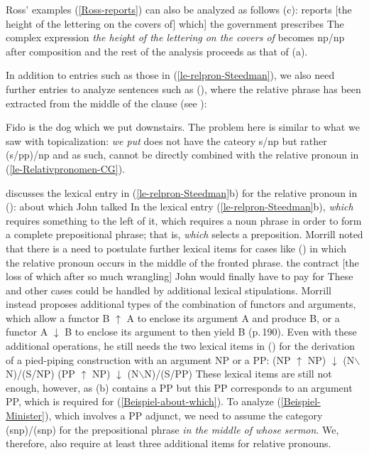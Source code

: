 Ross' examples (\ref{Ross-reports}) can also be analyzed as follows (c):
\ea
reports [the height of the lettering on the covers of]
which] the government prescribes
\z
The complex expression \emph{the height of the lettering on the covers of} becomes np/np after composition and the rest of the analysis
proceeds as that of (a).

In addition to entries such as those in (\ref{le-relpron-Steedman}), we also need further entries to
analyze sentences such as (), where the relative phrase has been extracted from the middle of
the clause (see \citealp[]{Pollard88a}):

\ea
Fido is the dog which we put downstairs.
\z
The problem here is similar to what we saw with topicalization: \emph{we put} does not have the cateory
s/np but rather (s/pp)/np and as such, cannot be directly combined with the relative pronoun in (\ref{le-Relativpronomen-CG}).

\citet[]{Morrill95a} discusses the lexical entry in (\ref{le-relpron-Steedman}b) for the relative pronoun in ():
\ea
\label{Beispiel-about-which}
about which John talked
\z
In the lexical entry (\ref{le-relpron-Steedman}b), \emph{which} requires something to the left of it, which requires a noun phrase in order to form a complete
prepositional phrase; that is, \emph{which} selects a preposition. Morrill noted that there is a need
to postulate further lexical items for cases like () in which the relative pronoun occurs in the middle of the fronted phrase.
\ea
the contract [the loss of which after so much wrangling] John would finally have to pay for
\z
These and other cases could be handled by additional lexical stipulations. Morrill instead proposes additional types of the combination of functors and
arguments, which allow a functor B $\uparrow$\is{$\uparrow$} A to enclose its argument A and produce B, or a functor A $\downarrow$\is{$\downarrow$}
B to enclose its argument to then yield B (p.\,190). Even with these additional operations, he still needs the two lexical items in ()
for the derivation of a pied-piping construction with an argument NP or a PP:
\eal
\ex (NP $\uparrow$ NP) $\downarrow$ (N$\backslash$N)/(S/NP)
\ex (PP $\uparrow$ NP) $\downarrow$ (N$\backslash$N)/(S/PP)
\zl
These lexical items are still not enough, however, as (b) contains a PP but this PP corresponds to an argument PP, which is required
for (\ref{Beispiel-about-which}). To analyze (\ref{Beispiel-Minister}), which involves a PP adjunct, we need to assume the category (s\bs np)/(s\bs np)  for the prepositional
phrase \emph{in the middle of whose sermon}. We, therefore, also require at least three additional items for relative pronouns.

